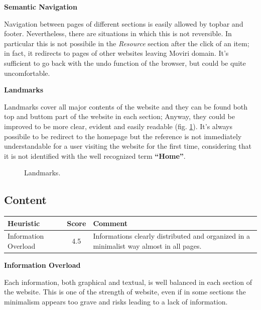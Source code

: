 \textbf{Semantic Navigation}\par
Navigation between pages of different sections is easily allowed by topbar and footer. Nevertheless, there are situations in which this is not reversible. In particular this is not possibile in the \textit{Resource} section after the click of an item; in fact, it redirects to pages of other websites leaving Moviri domain. It's sufficient to go back with the undo function of the browser, but could be quite uncomfortable.
\medskip

\textbf{Landmarks}\par
Landmarks cover all major contents of the website and they can be found both top and buttom part of the website in each section; Anyway, they could be improved to be more clear, evident and easily readable (fig. \ref{landmarks}). It’s always possibile to be redirect to the homepage but the reference is not immediately understandable for a user visiting the website for the first time, considering that it is not identified with the well recognized term \textbf{“Home”}.

\begin{figure}[H]
  \centering
        \caption{Landmarks.}
\label{landmarks}
\end{figure}

\subsection{Content}
\begin{table}[H]
  \begin{center}
    \label{tab:table1}
    \begin{tabular}{||l|c|p{8cm}||} %
      \textbf{Heuristic} & \textbf{Score} & \textbf{Comment}\\
      
      \hline
     Information Overload & 4.5 & Informations clearly distributed and organized in a minimalist way almost in all pages.\\
     
    \end{tabular}
  \end{center}
\end{table}
\medskip
\textbf{Information Overload}\par
Each information, both graphical and textual, is well balanced in each section of the website. This is one of the strength of website, even if in some sections the minimalism appears too grave and risks leading to a lack of information.

